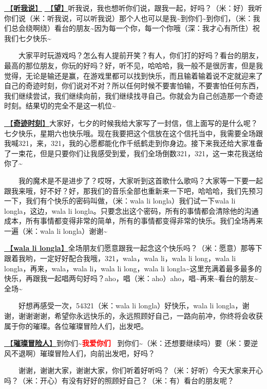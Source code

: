 \documentclass[]{ctexbook}
\begin{document}
\hyperref[listen-to-me]{🎵【\textbf{听我说}】} \hyperref[hope]{🎵【\textbf{望}】}听我说，我也想听你们说，跟我一起，好吗？（米：好）我听你们说（米：听我说，可以听我说）那个人也可以是我\textasciitilde 到你们\textasciitilde 到你们，（米：我们总会绕啊绕）看台的朋友\textasciitilde 因为每一个你，每一个你哦（深：我才心有所住）祝我们七夕快乐\textasciitilde{}

  大家平时玩游戏吗？怎么有人提前开笑？有人，你们打的好吗？看台的朋友，最高的那位朋友，你玩的好吗？好，听不见，哈哈哈，我一般不是很厉害，但是我觉得，无论是输还是赢，在游戏里都可以找到快乐，而且输着输着说不定就迎来了自己的奇迹时刻，你们说对不对？所以任何时候不要害怕输，不要害怕任何东西，我们继续尝试，我们继续向前，我们继续找寻自己。你就会为自己创造那一个奇迹时刻。结果切的完全不是这一机位\textasciitilde{}

\hyperref[magic-moment]{🎵【\textbf{奇迹时刻}】}大家好，七夕的时候我给大家写了一封信，信上面写的是什么呢？七夕快乐，星期六也快乐哦。现在我要把这个信放在这个信托当中，我需要全场跟我喊321，来，321，我的心愿都能化作千纸鹤走到你身边。接下来我还给大家准备了一束花，但是只要你们让我感受到爱，我们全场倒数321，321，这一束花我送给你了\textasciitilde{}

  我的魔术是不是进步了？哎呀，大家听到这首歌什么歌吗？大家等一下要一起跟我来哦，好不好？好，那我们的音乐全部也重新来一下吧，哈哈哈，我们先预习一下，我们有个快乐的密码叫做，（米：wala li longla）我们试一下wala li longla，这边，wala li longla。只要念出这个密码，所有的事情都会清除他的沟通成本，所有事情都变得非常的简单，所有的事情都变得非常的快乐。我们全场再来一遍（米：wala li longla）谢谢\textasciitilde{}

\hyperref[wala-li-longla]{🎵【\textbf{wala li longla}】}全场朋友们愿意跟我一起念这个快乐吗？（米：愿意）那等下跟着我哟，一定好好配合我哦，321，wala，wala li，wala li long，wala li longla，再来，wala，wala li，wala li long，wala li longla\textasciitilde 这里充满着最多最多的快乐，再跟我一起唱两句好吗？aho，唱（米：aho）aho，唱\textasciitilde 再来\textasciitilde 看台的朋友\textasciitilde 全场\textasciitilde{}

  好想再感受一次，54321（米：wala li longla）好快乐，wala li longla，谢谢，谢谢谢谢，希望你永远快乐的，永远照顾好自己，一路向前冲，你终将会收获属于你的璀璨。各位璀璨冒险人们，出发吧。

\hyperref[adventurers]{🎵【\textbf{璀璨冒险人}】}到你们\textasciitilde{}\textbf{\textcolor{red}{我爱你们~} } 到你们\textasciitilde（米：还想要继续吗）要（米：要逆风不退啊）璀璨冒险人们，向前出发吧，好吗？

  谢谢，谢谢大家，谢谢大家，你们听着好听吗？（米：好听）今天大家来开心吗？（米：开心）有没有好好的照顾好自己？（米：有）看台的朋友呢？
\end{document}
